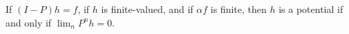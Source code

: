 If $(I - P)h = f$, if $h$ is finite-valued, and if $\alpha f$ is finite, then $h$ is a potential if and only if $\lim_n P^n h = 0$.
